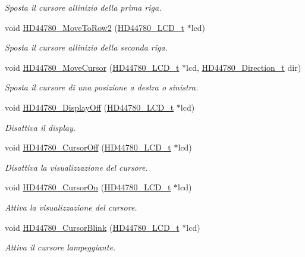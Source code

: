 \begin{DoxyCompactItemize}
\begin{DoxyCompactList}\small\item\em Sposta il cursore all\textquotesingle{}inizio della prima riga. \end{DoxyCompactList}\item 
void \hyperlink{group___h_d44780_ga713670d498b6f5d50a174df19081c515}{H\+D44780\+\_\+\+Move\+To\+Row2} (\hyperlink{struct_h_d44780___l_c_d__t}{H\+D44780\+\_\+\+L\+C\+D\+\_\+t} $\ast$lcd)
\begin{DoxyCompactList}\small\item\em Sposta il cursore all\textquotesingle{}inizio della seconda riga. \end{DoxyCompactList}\item 
void \hyperlink{group___h_d44780_gabcea9a03050c46530e39b7556c673baf}{H\+D44780\+\_\+\+Move\+Cursor} (\hyperlink{struct_h_d44780___l_c_d__t}{H\+D44780\+\_\+\+L\+C\+D\+\_\+t} $\ast$lcd, \hyperlink{group___h_d44780_gaf46f4db4f981d3a1088804a6d6980d30}{H\+D44780\+\_\+\+Direction\+\_\+t} dir)
\begin{DoxyCompactList}\small\item\em Sposta il cursore di una posizione a destra o sinistra. \end{DoxyCompactList}\item 
void \hyperlink{group___h_d44780_ga5cf07b2179272029410f9a81f56621ed}{H\+D44780\+\_\+\+Display\+Off} (\hyperlink{struct_h_d44780___l_c_d__t}{H\+D44780\+\_\+\+L\+C\+D\+\_\+t} $\ast$lcd)
\begin{DoxyCompactList}\small\item\em Disattiva il display. \end{DoxyCompactList}\item 
void \hyperlink{group___h_d44780_ga56421dc398825188aa10257063a3ee4b}{H\+D44780\+\_\+\+Cursor\+Off} (\hyperlink{struct_h_d44780___l_c_d__t}{H\+D44780\+\_\+\+L\+C\+D\+\_\+t} $\ast$lcd)
\begin{DoxyCompactList}\small\item\em Disattiva la visualizzazione del cursore. \end{DoxyCompactList}\item 
void \hyperlink{group___h_d44780_ga3a381cb44df5d76d79be5ed71a52bae6}{H\+D44780\+\_\+\+Cursor\+On} (\hyperlink{struct_h_d44780___l_c_d__t}{H\+D44780\+\_\+\+L\+C\+D\+\_\+t} $\ast$lcd)
\begin{DoxyCompactList}\small\item\em Attiva la visualizzazione del cursore. \end{DoxyCompactList}\item 
void \hyperlink{group___h_d44780_ga92eb58cb7d73c9a87b7087a9c56f73d5}{H\+D44780\+\_\+\+Cursor\+Blink} (\hyperlink{struct_h_d44780___l_c_d__t}{H\+D44780\+\_\+\+L\+C\+D\+\_\+t} $\ast$lcd)
\begin{DoxyCompactList}\small\item\em Attiva il cursore lampeggiante. \end{DoxyCompactList}\end{DoxyCompactItemize}


